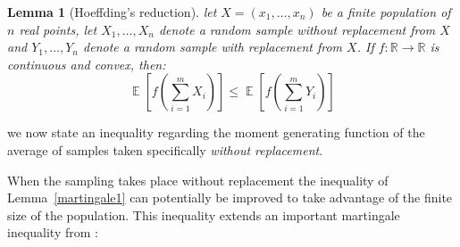 \documentclass[]{interact}
\DeclareMathOperator{\E}{\mathbb{E}}
\theoremstyle{plain}%
\newtheorem{lemma}[Theorem]{Lemma}
\theoremstyle{definition}
\theoremstyle{remark}
\begin{document}
\begin{lemma}[Hoeffding's reduction]\label{hoeffdings_reduction}
let $X=(x_1,\dots,x_n)$ be a finite population of $n$ real points, let $X_1,\dots,X_n$ denote a random sample without replacement from $X$ and $Y_1,\dots,Y_n$ denote a random sample with replacement from $X$. 
If $f:\mathbb{R}\rightarrow\mathbb{R}$ is continuous and convex, then:
$$\textstyle \E\left[f\left(\sum_{i=1}^mX_i\right)\right]\le\E\left[f\left(\sum_{i=1}^mY_i\right)\right] $$
\end{lemma}

we now state an inequality regarding the moment generating function of the average of samples taken specifically \textit{without replacement}.

When the sampling takes place without replacement the inequality of Lemma~\ref{martingale1} can potentially be improved to take advantage of the finite size of the population.
This inequality extends an important martingale inequality from \cite{bardenet2015}:
\end{document}
